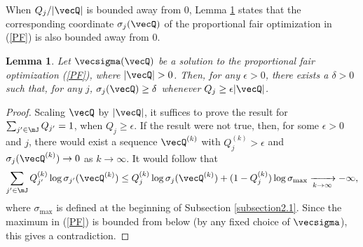 \documentclass{amsart}
\newtheorem{lemma}{Lemma}
\begin{document}
When $Q_j/|\vecQ|$ is bounded away from $0$, Lemma \ref{lm:lower.bound.sigma} states that the corresponding
coordinate $\sigma_j(\vecQ)$ of the proportional fair optimization in (\ref{PF}) is also bounded away from $0$.
\begin{lemma}\label{lm:lower.bound.sigma}
Let $\vecsigma(\vecQ)$ be a solution to the proportional fair optimization (\ref{PF}), where $|\vecQ| >0$.
Then, for any $\epsilon>0$, there exists a $\delta>0$ such that, for any $j$, 
 $\sigma_j(\vecQ)\geq \delta$ whenever $Q_j \geq \epsilon |\vecQ|$.
\end{lemma}
\begin{proof}
Scaling $\vecQ$ by $|\vecQ|$, it suffices to prove the result for $\sum_{j'\in \mJ}Q_{j'} = 1$, when $Q_j \ge \epsilon$.  If the result were not true, then, for some $\epsilon>0$ and $j$, there would exist a sequence $\vecQ^{(k)}$ with $Q_j^{(k)}>\epsilon$ and  $\sigma_j(\vecQ^{(k)}) \rightarrow 0$ as $k\rightarrow\infty$.
It would follow that
\begin{equation*}
\sum_{j' \in\mJ } Q^{(k)}_{j'} \log \sigma_{j'}(\vecQ^{(k)}) \leq Q_j^{(k)} \log \sigma_j(\vecQ^{(k)}) + (1- Q_j^{(k)}) \log \sigma_{\text{max}}
 \xrightarrow[k\rightarrow\infty]{} -\infty,
\end{equation*}
where $\sigma_{\text{max}}$ is defined at the beginning of Subsection \ref{subsection2.1}.
Since the maximum in (\ref{PF}) is bounded from below (by any fixed choice of $\vecsigma$), this gives a contradiction.
\iffalse
Consider the value
$$ s(\epsilon) = \inf_{\vecalpha:q_{j'} \geq \epsilon} \hat\sigma_{j'} $$
and assume that it is equal to $0$. The we can find a sequence $\vecalpha^{[k]}$
such that the corresponding optimal solutions $\hat\vecsigma^{[k]}$ have the $j'$ component vanishing.

However we would have that 
\begin{align}
q^{[k]}_{j'} \log \sigma^{[k]}_{j'} + \sum_{\tiny\begin{array}{c}j \in\mJ \\ j\not=j'\end{array}} q^{[k]}_j \log \sigma^{[k]}_j 
\leq
\epsilon \log \sigma^{[k]}_{j'} + |\mJ| \sigmamax \to -\infty
\end{align}
that is a contradiction, since $\hat\vecsigma^{[1]}$ would be a feasible solution with higher value of the objective function
$$\inf_{\vecalpha:q_{j'} \geq \epsilon} \left(
 q_{j'} \log \hat\sigma^{[1]}_{j'} 
+ \sum_{\tiny\begin{array}{c}j \in\mJ \\ j\not=j'\end{array}} q_j \log \hat\sigma^{[1]}_j 
\right) 
\geq 
|\mJ| \log \left( \min_{j \in\mJ}  \hat\sigma^{[1]}_j \right).$$
\fi
\end{proof}
\end{document}
